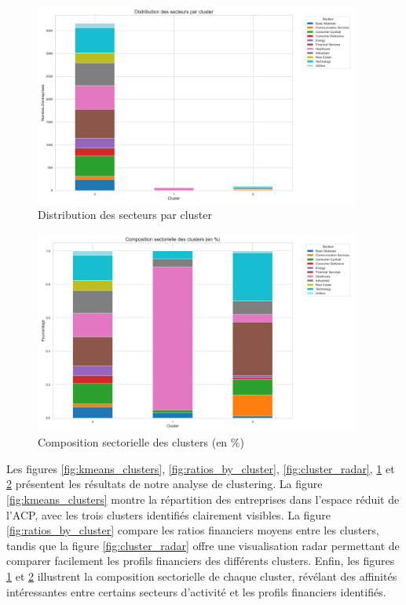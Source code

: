 \documentclass[11pt]{report}
\begin{document}
\begin{figure}[H]
    \centering
    \includegraphics[width=0.95\textwidth]{figures/sector_distribution_by_cluster.png}
    \caption{Distribution des secteurs par cluster}
    \label{fig:sector_by_cluster}
\end{figure}

\begin{figure}[H]
    \centering
    \includegraphics[width=0.95\textwidth]{figures/sector_percentage_by_cluster.png}
    \caption{Composition sectorielle des clusters (en \%)}
    \label{fig:sector_percentage}
\end{figure}

Les figures \ref{fig:kmeans_clusters}, \ref{fig:ratios_by_cluster}, \ref{fig:cluster_radar}, \ref{fig:sector_by_cluster} et \ref{fig:sector_percentage} présentent les résultats de notre analyse de clustering. La figure \ref{fig:kmeans_clusters} montre la répartition des entreprises dans l'espace réduit de l'ACP, avec les trois clusters identifiés clairement visibles. La figure \ref{fig:ratios_by_cluster} compare les ratios financiers moyens entre les clusters, tandis que la figure \ref{fig:cluster_radar} offre une visualisation radar permettant de comparer facilement les profils financiers des différents clusters. Enfin, les figures \ref{fig:sector_by_cluster} et \ref{fig:sector_percentage} illustrent la composition sectorielle de chaque cluster, révélant des affinités intéressantes entre certains secteurs d'activité et les profils financiers identifiés.
\end{document}
